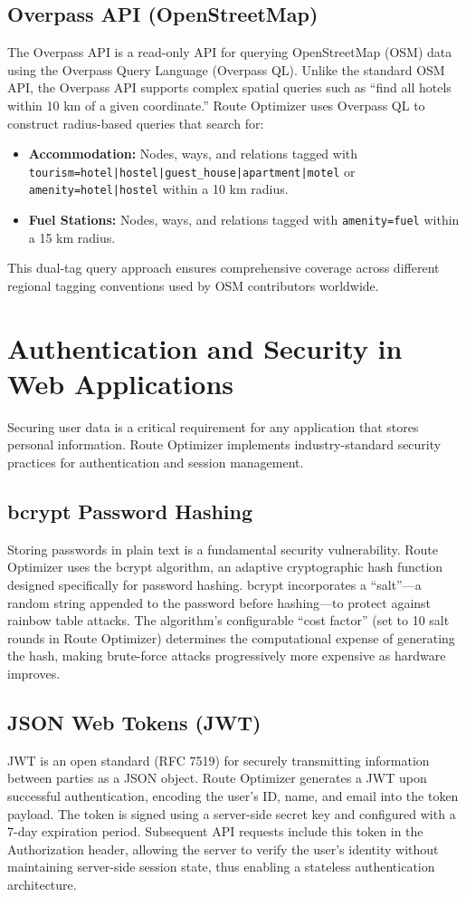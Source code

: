 \subsection{Overpass API (OpenStreetMap)}
The Overpass API is a read-only API for querying OpenStreetMap (OSM) data using the Overpass Query Language (Overpass QL). Unlike the standard OSM API, the Overpass API supports complex spatial queries such as ``find all hotels within 10 km of a given coordinate.'' Route Optimizer uses Overpass QL to construct radius-based queries that search for:
\begin{itemize}
    \item \textbf{Accommodation:} Nodes, ways, and relations tagged with \texttt{tourism=hotel|hostel|guest\_house|apartment|motel} or \texttt{amenity=hotel|hostel} within a 10 km radius.
    \item \textbf{Fuel Stations:} Nodes, ways, and relations tagged with \texttt{amenity=fuel} within a 15 km radius.
\end{itemize}
This dual-tag query approach ensures comprehensive coverage across different regional tagging conventions used by OSM contributors worldwide.

\section{Authentication and Security in Web Applications}
Securing user data is a critical requirement for any application that stores personal information. Route Optimizer implements industry-standard security practices for authentication and session management.

\subsection{bcrypt Password Hashing}
Storing passwords in plain text is a fundamental security vulnerability. Route Optimizer uses the bcrypt algorithm, an adaptive cryptographic hash function designed specifically for password hashing. bcrypt incorporates a ``salt''---a random string appended to the password before hashing---to protect against rainbow table attacks. The algorithm's configurable ``cost factor'' (set to 10 salt rounds in Route Optimizer) determines the computational expense of generating the hash, making brute-force attacks progressively more expensive as hardware improves.

\subsection{JSON Web Tokens (JWT)}
JWT is an open standard (RFC 7519) for securely transmitting information between parties as a JSON object. Route Optimizer generates a JWT upon successful authentication, encoding the user's ID, name, and email into the token payload. The token is signed using a server-side secret key and configured with a 7-day expiration period. Subsequent API requests include this token in the Authorization header, allowing the server to verify the user's identity without maintaining server-side session state, thus enabling a stateless authentication architecture.

